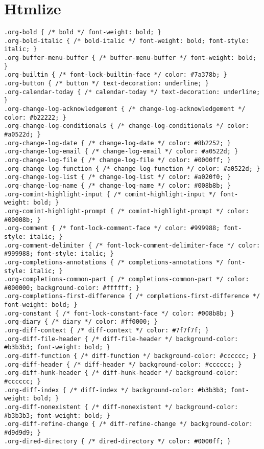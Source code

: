 \documentclass[11pt]{article}
\begin{document}
\section{Htmlize}
\label{sec:org76034a3}
\begin{verbatim}
.org-bold { /* bold */ font-weight: bold; }
.org-bold-italic { /* bold-italic */ font-weight: bold; font-style: italic; }
.org-buffer-menu-buffer { /* buffer-menu-buffer */ font-weight: bold; }
.org-builtin { /* font-lock-builtin-face */ color: #7a378b; }
.org-button { /* button */ text-decoration: underline; }
.org-calendar-today { /* calendar-today */ text-decoration: underline; }
.org-change-log-acknowledgement { /* change-log-acknowledgement */ color: #b22222; }
.org-change-log-conditionals { /* change-log-conditionals */ color: #a0522d; }
.org-change-log-date { /* change-log-date */ color: #8b2252; }
.org-change-log-email { /* change-log-email */ color: #a0522d; }
.org-change-log-file { /* change-log-file */ color: #0000ff; }
.org-change-log-function { /* change-log-function */ color: #a0522d; }
.org-change-log-list { /* change-log-list */ color: #a020f0; }
.org-change-log-name { /* change-log-name */ color: #008b8b; }
.org-comint-highlight-input { /* comint-highlight-input */ font-weight: bold; }
.org-comint-highlight-prompt { /* comint-highlight-prompt */ color: #00008b; }
.org-comment { /* font-lock-comment-face */ color: #999988; font-style: italic; }
.org-comment-delimiter { /* font-lock-comment-delimiter-face */ color: #999988; font-style: italic; }
.org-completions-annotations { /* completions-annotations */ font-style: italic; }
.org-completions-common-part { /* completions-common-part */ color: #000000; background-color: #ffffff; }
.org-completions-first-difference { /* completions-first-difference */ font-weight: bold; }
.org-constant { /* font-lock-constant-face */ color: #008b8b; }
.org-diary { /* diary */ color: #ff0000; }
.org-diff-context { /* diff-context */ color: #7f7f7f; }
.org-diff-file-header { /* diff-file-header */ background-color: #b3b3b3; font-weight: bold; }
.org-diff-function { /* diff-function */ background-color: #cccccc; }
.org-diff-header { /* diff-header */ background-color: #cccccc; }
.org-diff-hunk-header { /* diff-hunk-header */ background-color: #cccccc; }
.org-diff-index { /* diff-index */ background-color: #b3b3b3; font-weight: bold; }
.org-diff-nonexistent { /* diff-nonexistent */ background-color: #b3b3b3; font-weight: bold; }
.org-diff-refine-change { /* diff-refine-change */ background-color: #d9d9d9; }
.org-dired-directory { /* dired-directory */ color: #0000ff; }

\end{verbatim}
\end{document}
